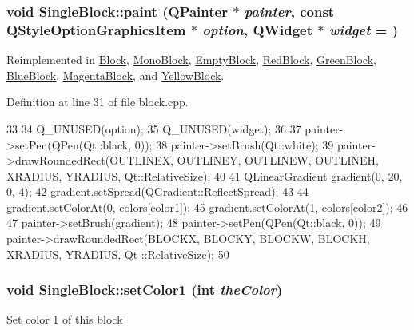\hypertarget{class_single_block_a397006b22a2f8dc67e27660f67546880}{
\subsubsection[{paint}]{\setlength{\rightskip}{0pt plus 5cm}void SingleBlock::paint (QPainter $\ast$ {\em painter}, \/  const QStyleOptionGraphicsItem $\ast$ {\em option}, \/  QWidget $\ast$ {\em widget} = {})}}
\label{class_single_block_a397006b22a2f8dc67e27660f67546880}


Reimplemented in \hyperlink{class_block_a36791d086b6fad1a2203bfef6fdbaa0a}{Block}, \hyperlink{class_mono_block_a8c2d5b6508508633c4c3234790945c51}{MonoBlock}, \hyperlink{class_empty_block_a1cec09fdef31d4404857dd22151a1834}{EmptyBlock}, \hyperlink{class_red_block_a78013615dbc11158d47eb38cc3d416cd}{RedBlock}, \hyperlink{class_green_block_a8ca48ce5449a83de5287d13d99bf2df1}{GreenBlock}, \hyperlink{class_blue_block_adc28e68ba0fa2c578815b77dde03ebdb}{BlueBlock}, \hyperlink{class_magenta_block_ac48f5303ee031233918abfa460dd7066}{MagentaBlock}, and \hyperlink{class_yellow_block_a37c29857cc065cab86a81bcfdd6c3f63}{YellowBlock}.

Definition at line 31 of file block.cpp.


\begin{DoxyCode}
33 {
34     Q_UNUSED(option);
35     Q_UNUSED(widget);
36 
37     painter->setPen(QPen(Qt::black, 0));
38     painter->setBrush(Qt::white);
39     painter->drawRoundedRect(OUTLINEX, OUTLINEY, OUTLINEW, OUTLINEH, XRADIUS, 
      YRADIUS, Qt::RelativeSize);
40 
41     QLinearGradient gradient(0, 20, 0, 4);
42     gradient.setSpread(QGradient::ReflectSpread);
43 
44     gradient.setColorAt(0, colors[color1]);
45     gradient.setColorAt(1, colors[color2]);
46 
47     painter->setBrush(gradient);
48     painter->setPen(QPen(Qt::black, 0));
49     painter->drawRoundedRect(BLOCKX, BLOCKY, BLOCKW, BLOCKH, XRADIUS, YRADIUS, Qt
      ::RelativeSize);
50 }
\end{DoxyCode}
\hypertarget{class_single_block_a9a3f135aaaf56aa7765dad47f6bb8f36}{
\subsubsection[{setColor1}]{\setlength{\rightskip}{0pt plus 5cm}void SingleBlock::setColor1 (int {\em theColor})}}
\label{class_single_block_a9a3f135aaaf56aa7765dad47f6bb8f36}
Set color 1 of this block 

